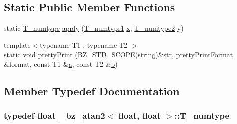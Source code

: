 \subsection*{Static Public Member Functions}
\begin{DoxyCompactItemize}
\item 
static \hyperlink{class__bz__atan2_3_01float_00_01float_01_4_a9dc9e00c8eb66cce61fb805cd67b0497}{T\+\_\+numtype} \hyperlink{class__bz__atan2_3_01float_00_01float_01_4_adbe997af0720d164d19b31e332490573}{apply} (\hyperlink{class__bz__atan2_3_01float_00_01float_01_4_a9010222958faf35b39d64435d13ac0e4}{T\+\_\+numtype1} \hyperlink{vecnorm1_8cc_ac73eed9e41ec09d58f112f06c2d6cb63}{x}, \hyperlink{class__bz__atan2_3_01float_00_01float_01_4_a096f32debf3cf0e75bf955ef2c6fd44e}{T\+\_\+numtype2} y)
\item 
{\footnotesize template$<$typename T1 , typename T2 $>$ }\\static void \hyperlink{class__bz__atan2_3_01float_00_01float_01_4_a06a0a840c6b20a345e4728bcf34146b6}{pretty\+Print} (\hyperlink{numinquire_8h_a2b24ffc3b4ef9803956bc7715c6c7b83}{B\+Z\+\_\+\+S\+T\+D\+\_\+\+S\+C\+O\+P\+E}(string)\&str, \hyperlink{classprettyPrintFormat}{pretty\+Print\+Format} \&format, const T1 \&\hyperlink{gen__mat5files_8m_aae328bf20413f220e38aec4d95bfd6da}{a}, const T2 \&\hyperlink{gen__mat5files_8m_a7b38767b3b6a8dae167e5afa4fc340b0}{b})
\end{DoxyCompactItemize}


\subsection{Member Typedef Documentation}
\hypertarget{class__bz__atan2_3_01float_00_01float_01_4_a9dc9e00c8eb66cce61fb805cd67b0497}{}
\subsubsection[{T\+\_\+numtype}]{\setlength{\rightskip}{0pt plus 5cm}typedef float {\bf \+\_\+bz\+\_\+atan2}$<$ float, float $>$\+::{\bf T\+\_\+numtype}}\label{class__bz__atan2_3_01float_00_01float_01_4_a9dc9e00c8eb66cce61fb805cd67b0497}
\hypertarget{class__bz__atan2_3_01float_00_01float_01_4_a9010222958faf35b39d64435d13ac0e4}{}
